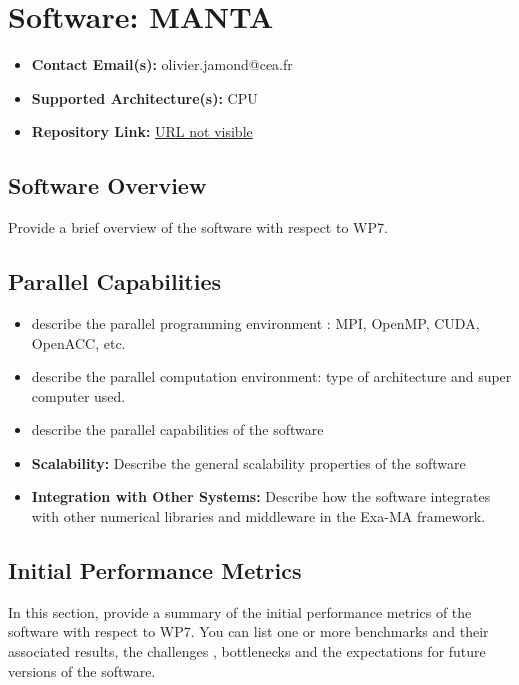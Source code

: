 \section{Software: MANTA}
\label{sec:WP7:MANTA:software}

\begin{itemize}
    \item \textbf{Contact Email(s):} olivier.jamond@cea.fr
    \item \textbf{Supported Architecture(s):} CPU
    \item \textbf{Repository Link:} \href{URL not visible}{URL not visible}
\end{itemize}

\subsection{Software Overview}
\label{sec:WP7:MANTA:summary}

Provide a brief overview of the software with respect to WP7.

\subsection{Parallel Capabilities}
\label{sec:WP7:MANTA:performances}


\begin{itemize}
    \item describe the parallel programming  environment : MPI, OpenMP, CUDA, OpenACC, etc.
    \item describe the parallel computation environment: type of architecture and super computer used.
    \item describe the parallel capabilities of the software
    \item \textbf{Scalability:} Describe the general scalability properties of the software
    \item \textbf{Integration with Other Systems:} Describe how the software integrates with other numerical libraries and middleware in the Exa-MA framework.
\end{itemize}

\subsection{Initial Performance Metrics}
\label{sec:WP7:MANTA:metrics}

In this section, provide a summary of the initial performance metrics of the software with respect to WP7.
You can list one or more benchmarks and their associated results, the challenges , bottlenecks and the expectations for future versions of the software.



